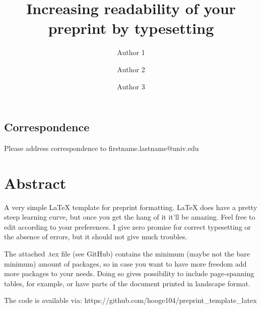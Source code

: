 \documentclass[onecolumn, 11pt,openany]{memoir}
\begin{document}
\thispagestyle{empty}                   
\frontmatter

\title{Increasing readability of your preprint by typesetting}
\author[1,2]{Author 1}
\author[1]{Author 2}
\author[3]{Author 3}
\begin{scriptsize}
\end{scriptsize}
\date{\vspace{-5ex}} %
\maketitle

\subsection{Correspondence}
Please address correspondence to firstname.lastname@univ.edu

\pagestyle{plain}

\section{Abstract}
A very simple \LaTeX{} template for preprint formatting. LaTeX does have a pretty steep learning curve, but once you get the hang of it it'll be amazing.  Feel free to edit according to your preferences. I give zero promise for correct typesetting or the absence of errors, but it should not give much troubles.

The attached .tex file (see GitHub) contains the minimum (maybe not the bare minimum) amount of packages, so in case you want to have more freedom add more packages to your needs. Doing so gives possibility to include page-spanning tables, for example, or have parts of the document printed in landscape format.

The code is available via: https://github.com/hooge104/preprint\_template\_latex
\end{document}
